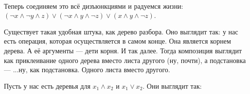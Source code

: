 \documentclass{article}
\begin{document}
\begin{itemize}
\begin{Example}
\begin{tabular}{|c|}
            \end{tabular}\\
            Теперь соединяем это всё дизъюнкциями и радуемся жизни: $(\neg x\land\neg y\land z)\lor(\neg x\land y\land\neg z)\lor(x\land y\land\neg z)$.
        \end{Example}
        \begin{Comment}
            Существует такая удобная штука, как дерево разбора. Оно выглядит так: у нас есть операция, которая осуществляется в самом конце. Она является корнем дерева. А её аргументы --- дети корня. И так далее. Тогда композиция выглядит как приклеивание одного дерева вместо листа другого (ну, почти), а подстановка --- ...ну, как подстановка. Одного листа вместо другого.
            \begin{Example}
                Пусть у нас есть деревья для $x_1\land x_2$ и $x_1\lor x_2$. Они выглядит так:\\
\end{Example}
\end{Comment}
\end{itemize}
\end{document}
